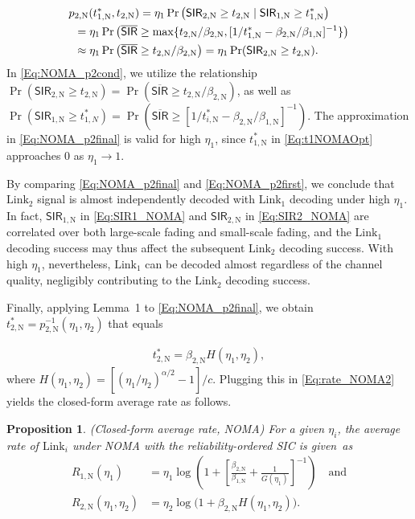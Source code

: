 \documentclass[conference]{IEEEtran}
\newtheorem{proposition}{Proposition}
\def\SIR{\mathsf{SIR}}
\def\({\left(}
\def\){\right)}
\def\[{\left[}
\def\]{\right]}
\def\SIRn{\widetilde{\SIR}}
\def\NOMA{\text{N}}
\def\L{\text{Link}}
\def\SIRn{\overline{\SIR}}
\def\thmspacing{1.1}
\begin{document}
\vspace{-10pt}\small\begin{align}
&\hspace{-5pt} p_{2,\NOMA}(t_{1,\NOMA}^*,t_{2,\NOMA}) = \eta_1 \Pr\(\SIR_{2,\NOMA} \geq t_{2,\NOMA}\mid\SIR_{1,\NOMA} \geq t_{1,\NOMA}^*\) \label{Eq:NOMA_p2first}\\
\hspace{5pt}&= \eta_1 \Pr\(\SIRn \geq \max\{t_{2,\NOMA}/\beta_{2,\NOMA}, [1/t_{1,\NOMA}^* - \beta_{2,\NOMA}/\beta_{1,\NOMA} ]^{-1} \} \) \label{Eq:NOMA_p2cond}\\
\hspace{5pt}&\approx \eta_1 \Pr\(\SIRn \geq t_{2,\NOMA}/\beta_{2,\NOMA} \) = \eta_1 \Pr(\SIR_{2,\NOMA}\geq t_{2,\NOMA}). \label{Eq:NOMA_p2final}
\end{align}\normalsize
In \eqref{Eq:NOMA_p2cond}, we utilize the relationship $\Pr(\SIR_{2,\NOMA}\geq t_{2,\NOMA})=\Pr(\SIRn \geq t_{2,\NOMA}/\beta_{2,\NOMA})$, as well as $\Pr\(\SIR_{1,\NOMA}\geq t_{1,N}^*\)=\Pr(\SIRn \geq [1/t_{i,\NOMA}^*-\beta_{2,\NOMA}/\beta_{1,\NOMA}]^{-1})$. The approximation in \eqref{Eq:NOMA_p2final} is valid for high $\eta_{1}$, since $t_{1,\NOMA}^*$ in \eqref{Eq:t1NOMAOpt} approaches $0$ as $\eta_1\rightarrow 1$. 

By comparing \eqref{Eq:NOMA_p2final} and \eqref{Eq:NOMA_p2first}, we conclude that $\L_2$ signal is almost independently decoded with $\L_1$ decoding under high $\eta_1$. In fact, $\SIR_{1,\NOMA}$ in \eqref{Eq:SIR1_NOMA} and $\SIR_{2,\NOMA}$ in \eqref{Eq:SIR2_NOMA} are correlated over both large-scale fading and small-scale fading, and the $\L_1$ decoding success may thus affect the subsequent $\L_2$ decoding success. With high $\eta_1$, nevertheless, $\L_1$ can be decoded almost regardless of the channel quality, negligibly contributing to the $\L_2$ decoding success.

Finally, applying Lemma~1 to \eqref{Eq:NOMA_p2final}, we obtain $t_{2,\NOMA}^*=p_{2,\NOMA}^{-1}(\eta_1,\eta_2)$ that equals 

\vspace{-10pt}\small\begin{align}
t_{2,\NOMA}^* = \beta_{2,\NOMA} H(\eta_1,\eta_2),
\end{align}\normalsize
where $H(\eta_1,\eta_2)=[(\eta_1/\eta_2)^{\alpha/2}-1]/c$. Plugging this in \eqref{Eq:rate_NOMA2} yields the closed-form average rate as follows.
\begin{proposition}
\linespread{\thmspacing}
(Closed-form average rate, NOMA) \emph{For a given $\eta_i$, the average rate of $\L_i$ under NOMA with the reliability-ordered SIC is given~as
\small\begin{align}
R_{1,\NOMA}(\eta_1) &= \eta_1 \log\(1 + \[\frac{\beta_{2,\NOMA}}{\beta_{1,\NOMA}} + \frac{1}{G(\eta_1)}\]^{-1} \) \quad\text{and} \label{Eq:Prop3Rate1_NOMA}\\
R_{2,\NOMA}(\eta_1,\eta_2) &= \eta_2  \log\Big(1 + \beta_{2,\NOMA}H(\eta_1,\eta_2)\Big). \label{Eq:Prop3Rate2_NOMA}
\end{align}\normalsize
}\end{proposition}
\end{document}
